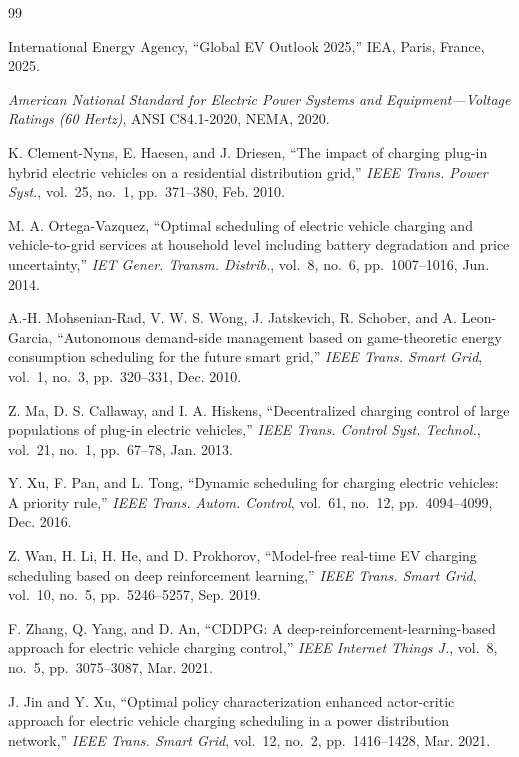 \begin{thebibliography}{99}

 International Energy Agency, ``Global EV Outlook 2025,'' IEA, Paris, France, 2025.

 \emph{American National Standard for Electric Power Systems and Equipment---Voltage Ratings (60 Hertz)}, ANSI C84.1-2020, NEMA, 2020.

 K. Clement-Nyns, E. Haesen, and J. Driesen, ``The impact of charging plug-in hybrid electric vehicles on a residential distribution grid,'' \emph{IEEE Trans. Power Syst.}, vol.~25, no.~1, pp.~371--380, Feb. 2010.

 M. A. Ortega-Vazquez, ``Optimal scheduling of electric vehicle charging and vehicle-to-grid services at household level including battery degradation and price uncertainty,'' \emph{IET Gener. Transm. Distrib.}, vol.~8, no.~6, pp.~1007--1016, Jun. 2014.

 A.-H. Mohsenian-Rad, V. W. S. Wong, J. Jatskevich, R. Schober, and A. Leon-Garcia, ``Autonomous demand-side management based on game-theoretic energy consumption scheduling for the future smart grid,'' \emph{IEEE Trans. Smart Grid}, vol.~1, no.~3, pp.~320--331, Dec. 2010.

 Z. Ma, D. S. Callaway, and I. A. Hiskens, ``Decentralized charging control of large populations of plug-in electric vehicles,'' \emph{IEEE Trans. Control Syst. Technol.}, vol.~21, no.~1, pp.~67--78, Jan. 2013.

 Y. Xu, F. Pan, and L. Tong, ``Dynamic scheduling for charging electric vehicles: A priority rule,'' \emph{IEEE Trans. Autom. Control}, vol.~61, no.~12, pp.~4094--4099, Dec. 2016.

 Z. Wan, H. Li, H. He, and D. Prokhorov, ``Model-free real-time EV charging scheduling based on deep reinforcement learning,'' \emph{IEEE Trans. Smart Grid}, vol.~10, no.~5, pp.~5246--5257, Sep. 2019.

 F. Zhang, Q. Yang, and D. An, ``CDDPG: A deep-reinforcement-learning-based approach for electric vehicle charging control,'' \emph{IEEE Internet Things J.}, vol.~8, no.~5, pp.~3075--3087, Mar. 2021.

 J. Jin and Y. Xu, ``Optimal policy characterization enhanced actor-critic approach for electric vehicle charging scheduling in a power distribution network,'' \emph{IEEE Trans. Smart Grid}, vol.~12, no.~2, pp.~1416--1428, Mar. 2021.


\end{thebibliography}
